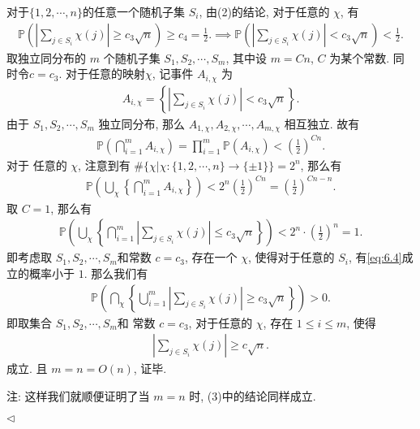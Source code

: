 \documentclass[11pt]{article}
\newenvironment{answer}[1][Solution]{\begin{trivlist}
    \item[\hskip \labelsep {\bfseries #1.}\hskip \labelsep]}{\hfill$\lhd$\end{trivlist}}
\newcommand\1{\mathds{1}}
\newcommand\PP{\mathbb{P}}
\begin{document}
\begin{answer}
\begin{enumerate}[label=(\arabic*)]
        对于$\{1,2,\cdots, n\}$的任意一个随机子集 $S_i$, 由(2)的结论, 对于任意的 $\chi$, 有
        \begin{align*}
            \PP\left(\left|\sum_{j\in S_i}\chi(j)\right| \ge c_3 \sqrt{n}\right) \ge c_4 = \frac{1}{2}. \implies \PP\left(\left|\sum_{j\in S_i}\chi(j)\right| < c_3 \sqrt{n}\right) < \frac{1}{2}.
        \end{align*}
        取独立同分布的 $m$ 个随机子集 $S_1, S_2, \cdots, S_m$, 其中设 $m = Cn$, $C$ 为某个常数. 同时令$c = c_3$. 对于任意的映射$\chi$, 记事件 $A_{i,\chi}$ 为
        \begin{align*}
            A_{i,\chi} = \left\{\left|\sum_{j\in S_i}\chi(j)\right| < c_3 \sqrt{n}\right\}.
        \end{align*}
        由于 $S_1, S_2, \cdots, S_m$ 独立同分布, 那么 $A_{1, \chi}, A_{2,\chi}, \cdots, A_{m,\chi}$ 相互独立. 故有 
        \begin{align*}
            \PP\left(\bigcap_{i=1}^m A_{i,\chi}\right)  = \prod_{i=1}^m \PP(A_{i,\chi}) < \left(\frac{1}{2}\right)^{Cn}.
        \end{align*}
        对于 任意的 $\chi$, 注意到有 $\#\{\chi | \chi:\{1,2,\cdots, n\}\to \{\pm 1\}\} = 2^n$, 那么有
        \begin{align*}
            \PP\left( \bigcup_\chi \left\{\bigcap_{i=1}^m A_{i,\chi}\right\}\right) < 2^n \left(\frac{1}{2}\right)^{Cn} = \left(\frac{1}{2}\right)^{Cn - n}.
        \end{align*}
        取 $C = 1$, 那么有 
        \begin{align*}
            \PP\left( \bigcup_\chi \left\{\bigcap_{i=1}^m\left|\sum_{j\in S_i} \chi(j)\right| \le c_3 \sqrt{n}\right\}\right) < 2^n \cdot \left(\frac{1}{2}\right)^{n} = 1.
        \end{align*}
        即考虑取 $S_1, S_2, \cdots, S_m$和常数 $c=c_3$, 存在一个 $\chi$, 使得对于任意的 $S_i$, 有\eqref{eq:6.4}成立的概率小于 $1$. 那么我们有
        \begin{align*}
            \PP\left( \bigcap_\chi \left\{\bigcup_{i=1}^m\left|\sum_{j\in S_i} \chi(j)\right| \ge c_3 \sqrt{n}\right\}\right) > 0.
        \end{align*}
        即取集合 $S_1, S_2, \cdots, S_m$和 常数 $c=c_3$, 对于任意的 $\chi$, 存在 $1\le i\le m$, 使得
        \begin{align*}
            \left|\sum_{j\in S_i}\chi(j)\right| \ge c\sqrt{n}.
        \end{align*}
        成立. 
        且 $m = n = O(n)$, 证毕.

        注: 这样我们就顺便证明了当 $m=n$ 时, (3)中的结论同样成立.
    \end{enumerate}
\end{answer}
\end{document}
